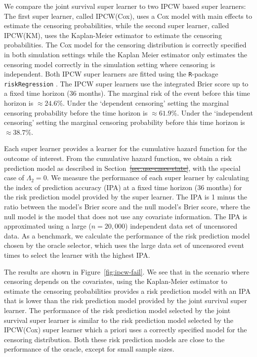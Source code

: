 \documentclass[lineno]{biometrika}
\newcommand{\1}{\mathds{1}}
\providecommand{\DIFadd}[1]{{\protect\color{blue}\uwave{#1}}} %
\providecommand{\DIFdel}[1]{{\protect\color{red}\sout{#1}}}                      %
\providecommand{\DIFaddbegin}{} %
\providecommand{\DIFaddend}{} %
\providecommand{\DIFdelbegin}{} %
\providecommand{\DIFdelend}{} %
\begin{document}
We compare the joint survival super learner to two IPCW based super learners: The
first super learner, called IPCW(Cox), uses a Cox model with main
effects to estimate the censoring probabilities, while the second
super learner, called IPCW(KM), uses the Kaplan-Meier estimator to
estimate the censoring probabilities. The Cox model for the censoring
distribution is correctly specified in both simulation settings while
the Kaplan Meier estimator only estimates the censoring model
correctly in the simulation setting where censoring is
independent. Both IPCW super learners are fitted using the
\texttt{R}-package \texttt{riskRegression}
\citep{Gerds_Ohlendorff_Ozenne_2023}.
%
%
The IPCW super learners use the integrated Brier score up to a fixed time
horizon (36 months). The marginal risk of the event before this time horizon is
\(\approx 24.6\)\%. Under the `dependent censoring' setting the marginal
censoring probability before the time horizon is \(\approx 61.9\)\%. Under the
`independent censoring' setting the marginal censoring probability before this
time horizon is \( \approx 38.7 \)\%.

Each super learner provides a learner for the cumulative hazard
function for the outcome of interest. From the cumulative hazard
function, we obtain a risk prediction model as described in
Section~\DIFdelbegin \DIFdel{\ref{sec:use-cases-state}}\DIFdelend \DIFaddbegin \DIFadd{\ref{sec:joint-survival-super-learner}}\DIFaddend , with the special case of
$\Lambda_2 = 0$. We measure the performance of each super learner by
calculating the index of prediction accuracy (IPA)
\citep{kattan2018index} at a fixed time horizon (36 months) for the
risk prediction model provided by the super learner. The IPA is 1
minus the ratio between the model's Brier score and the null model's
Brier score, where the null model is the model that does not use any
covariate information. The IPA is approximated using a large
(\( n = 20,000 \)) independent data set of uncensored data. As a
benchmark, we calculate the performance of the risk prediction model
chosen by the oracle selector, which uses the large data set of
uncensored event times to select the learner with the highest IPA.

The results are shown in Figure~\ref{fig:ipcw-fail}. We see that in
the scenario where censoring depends on the covariates, using the
Kaplan-Meier estimator to estimate the censoring probabilities
provides a risk prediction model with an IPA that is lower than the
risk prediction model provided by the joint survival super learner. The performance
of the risk prediction model selected by the joint survival super learner is similar
to the risk prediction model selected by the IPCW(Cox) super learner
which a priori uses a correctly specified model for the censoring
distribution. Both these risk prediction models are close to the
performance of the oracle, except for small sample sizes.
\end{document}
